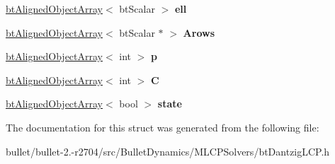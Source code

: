 \begin{DoxyCompactItemize}
\item 
\hypertarget{structbt_dantzig_scratch_memory_a365217e1cb41e0d67de949ee6c59df5d}{\hyperlink{classbt_aligned_object_array}{bt\+Aligned\+Object\+Array}$<$ bt\+Scalar $>$ {\bfseries ell}}\label{structbt_dantzig_scratch_memory_a365217e1cb41e0d67de949ee6c59df5d}

\item 
\hypertarget{structbt_dantzig_scratch_memory_a4e5bc7421ff345825c072d472f7d33cf}{\hyperlink{classbt_aligned_object_array}{bt\+Aligned\+Object\+Array}$<$ bt\+Scalar $\ast$ $>$ {\bfseries Arows}}\label{structbt_dantzig_scratch_memory_a4e5bc7421ff345825c072d472f7d33cf}

\item 
\hypertarget{structbt_dantzig_scratch_memory_ab01a3ac861ada8a5cb08c9f00706e8c6}{\hyperlink{classbt_aligned_object_array}{bt\+Aligned\+Object\+Array}$<$ int $>$ {\bfseries p}}\label{structbt_dantzig_scratch_memory_ab01a3ac861ada8a5cb08c9f00706e8c6}

\item 
\hypertarget{structbt_dantzig_scratch_memory_a1b0fabeb0d733ddb51c5165f54893c8e}{\hyperlink{classbt_aligned_object_array}{bt\+Aligned\+Object\+Array}$<$ int $>$ {\bfseries C}}\label{structbt_dantzig_scratch_memory_a1b0fabeb0d733ddb51c5165f54893c8e}

\item 
\hypertarget{structbt_dantzig_scratch_memory_aa15ba6ab13b6a89746340934fd124409}{\hyperlink{classbt_aligned_object_array}{bt\+Aligned\+Object\+Array}$<$ bool $>$ {\bfseries state}}\label{structbt_dantzig_scratch_memory_aa15ba6ab13b6a89746340934fd124409}

\end{DoxyCompactItemize}


The documentation for this struct was generated from the following file\+:\begin{DoxyCompactItemize}
\item 
bullet/bullet-\/2.-\/r2704/src/\+Bullet\+Dynamics/\+M\+L\+C\+P\+Solvers/bt\+Dantzig\+L\+C\+P.\+h\end{DoxyCompactItemize}
